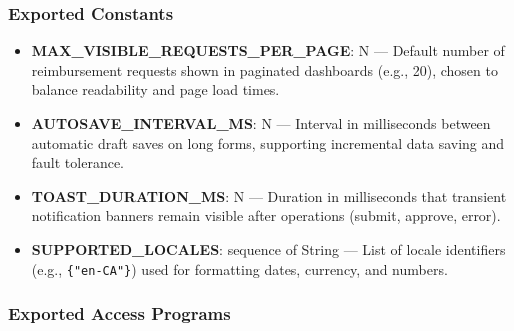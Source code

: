 \documentclass[12pt, titlepage]{article}
\begin{document}
\subsubsection{Exported Constants}

\begin{itemize}
  \item \textbf{MAX\_VISIBLE\_REQUESTS\_PER\_PAGE}: N --- Default number of reimbursement requests shown in paginated dashboards (e.g., 20), chosen to balance readability and page load times.
  \item \textbf{AUTOSAVE\_INTERVAL\_MS}: N --- Interval in milliseconds between automatic draft saves on long forms, supporting incremental data saving and fault tolerance.
  \item \textbf{TOAST\_DURATION\_MS}: N --- Duration in milliseconds that transient notification banners remain visible after operations (submit, approve, error).
  \item \textbf{SUPPORTED\_LOCALES}: sequence of String --- List of locale identifiers (e.g., \texttt{\{"en-CA"\}}) used for formatting dates, currency, and numbers.
\end{itemize}

\subsubsection{Exported Access Programs}
\end{document}
